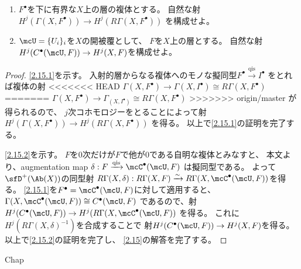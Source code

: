 \documentclass[uplatex,dvipdfmx]{jsarticle}
\begin{document}
\maketitle
\HeaderCommentA
\section{}

\fi



\begin{prob}\label{2.15}
  \begin{enumerate}
    \item \label{2.15.1}
    \(F^{\bullet}\)を下に有界な\(X\)上の層の複体とする。
    自然な射
    \(H^j(\Gamma(X,F^{\bullet})) \to H^j(R\Gamma(X,F^{\bullet}))\)
    を構成せよ。
    \item \label{2.15.2}
    \(\mcU = \{U_i\}_i\)を\(X\)の開被覆として、
    \(F\)を\(X\)上の層とする。
    自然な射\(H^j(C^{\bullet}(\mcU,F)) \to H^j(X,F)\)を構成せよ。
  \end{enumerate}
\end{prob}

\begin{proof}
  \ref{2.15.1}を示す。
  入射的層からなる複体へのモノな擬同型\(F^{\bullet}\xrightarrow{\text{qis}}I^{\bullet}\)
  をとれば複体の射
<<<<<<< HEAD
  \(\Gamma(X,F^{\bullet})\to \Gamma(X,I^{\bullet})\cong R\Gamma(X,F^{\bullet})\)
=======
  \(\Gamma(X,F^{\bullet})\to \Gamma_(X,I^{\bullet})\cong R\Gamma(X,F^{\bullet})\)
>>>>>>> origin/master
  が得られるので、
  \(j\)次コホモロジーをとることによって射
  \(H^j(\Gamma(X,F^{\bullet})) \to H^j(R\Gamma(X,F^{\bullet}))\)
  を得る。
  以上で\ref{2.15.1}の証明を完了する。

  \ref{2.15.2}を示す。
  \(F\)を\(0\)次だけが\(F\)で他が\(0\)である自明な複体とみなすと、
  本文\cite[Proposition 2.8.4]{kashiwara2002sheaves}より、augmentation map
  \(\delta:F\xrightarrow{\text{qis}} \mcC^{\bullet}(\mcU,F)\)
  は擬同型である。
  よって\(\sfD^+(\Ab(X))\)の同型射
  \(R\Gamma(X,\delta):R\Gamma(X,F)\xrightarrow{\sim}
  R\Gamma(X,\mcC^{\bullet}(\mcU,F))\)を得る。
  \ref{2.15.1}を\(F^{\bullet} = \mcC^{\bullet}(\mcU,F)\)に対して適用すると、
  \(\Gamma(X,\mcC^{\bullet}(\mcU,F)) \cong C^{\bullet}(\mcU,F)\)
  であるので、射
  \(H^j(C^{\bullet}(\mcU,F)) \to H^j(R\Gamma(X,\mcC^{\bullet}(\mcU,F))\)
  を得る。
  これに\(H^j(R\Gamma(X,\delta)^{-1})\)を合成することで
  射\(H^j(C^{\bullet}(\mcU,F))\to H^j(X,F)\)を得る。
  以上で\ref{2.15.2}の証明を完了し、
  \autoref{2.15}の解答を完了する。
\end{proof}




\ifcsname Chap\endcsname\else
\printbibliography
\end{document}
